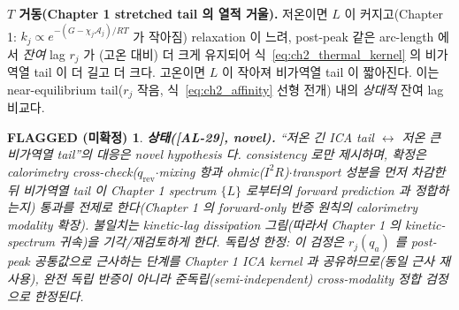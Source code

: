 \documentclass[11pt,a4paper]{article}
\newtheorem*{flagbox}{FLAGGED (미확정)}
\newcommand{\rev}{\mathrm{rev}}
\newcommand{\AL}[1]{\textsf{[AL-#1]}}
\begin{document}
\textbf{$T$ 거동(Chapter 1 stretched tail 의 열적 거울).} 저온이면 $L$ 이 커지고(Chapter 1: $k_j\propto e^{-(G-\chi_j\mathcal A_j)/RT}$
가 작아짐) relaxation 이 느려, post-peak 같은 arc-length 에서 \emph{잔여} lag $r_j$ 가 (고온 대비) 더 크게
유지되어 식~\eqref{eq:ch2_thermal_kernel} 의 비가역열 tail 이 더 길고 더 크다. 고온이면 $L$ 이 작아져 비가역열
tail 이 짧아진다. 이는 near-equilibrium tail($r_j$ 작음, 식~\eqref{eq:ch2_affinity} 선형 전개) 내의 \emph{상대적}
잔여 lag 비교다.
\begin{flagbox}
\textbf{상태(\AL{29}, novel).} ``저온 긴 ICA tail $\leftrightarrow$ 저온 큰 비가역열 tail''의 대응은 novel
hypothesis 다. consistency 로만 제시하며, \emph{확정}은 calorimetry cross-check($q_\rev$$\cdot$mixing 항과
ohmic($I^2R$)$\cdot$transport 성분을 먼저 차감한 뒤 비가역열 tail 이 Chapter 1 spectrum $\{L\}$ 로부터의
forward prediction 과 정합하는지) 통과를
전제로 한다(Chapter 1 의 forward-only 반증 원칙의 calorimetry modality 확장). 불일치는 kinetic-lag dissipation
그림(따라서 Chapter 1 의 kinetic-spectrum 귀속)을 기각/재검토하게 한다. \emph{독립성 한정}: 이 검정은 $r_j(q_a)$
를 post-peak 공통값으로 근사하는 단계를 Chapter 1 ICA kernel 과 \emph{공유}하므로(동일 근사 재사용), 완전 독립
반증이 아니라 \emph{준독립}(semi-independent) cross-modality 정합 검정으로 한정된다.
\end{flagbox}

\end{document}
